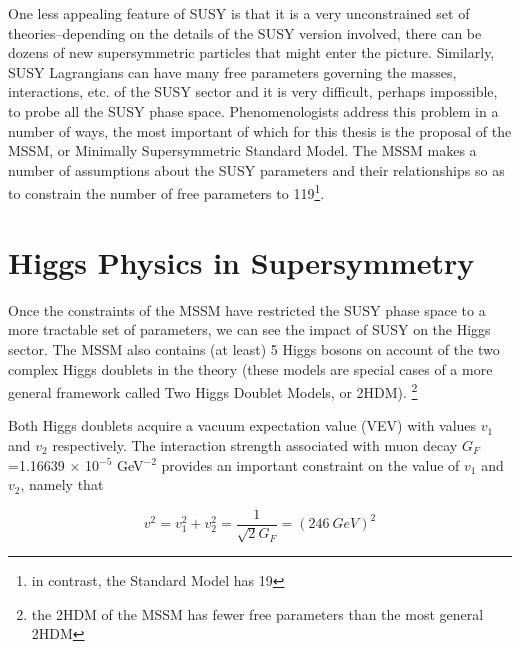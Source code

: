 One less appealing feature of SUSY is that it is a very unconstrained set 
of theories--depending on the details of the SUSY version involved, there can 
be dozens of new supersymmetric particles that might enter 
the picture.  Similarly, SUSY Lagrangians can have many free parameters governing the masses, 
interactions, etc. of the SUSY sector and it is very difficult, perhaps 
impossible, to probe all the SUSY phase space.  Phenomenologists address this problem in 
a number of ways, the most important of which for this thesis is the 
proposal of the MSSM, or Minimally Supersymmetric Standard Model.  The MSSM makes a 
number of assumptions about the SUSY parameters and their relationships so as to constrain the 
number of free parameters to 119\footnote{in
contrast, the Standard Model has 19}.  

\section{Higgs Physics in Supersymmetry}
\label{sec:SUSY_Higgs}
Once the constraints of the MSSM have restricted the SUSY phase space to a more 
tractable set of parameters, we can see the impact of SUSY on the Higgs sector.  
The MSSM also contains (at least) 5 Higgs bosons on account of the 
two complex Higgs doublets in the theory (these models are 
special cases of a more general framework called Two Higgs Doublet Models, or 2HDM).
\footnote{the 2HDM of the MSSM has fewer free parameters than the most general 2HDM}  



Both Higgs doublets acquire a vacuum expectation value (VEV) with values $v_1$ 
and $v_2$ respectively.  The interaction strength associated with
muon decay $G_F$=1.16639 $\times$ 10$^{-5}$ GeV$^{-2}$ 
provides an important constraint on the value of $v_1$ and $v_2$, namely that 

\begin{equation}
	v^2 = v_1^2 + v_2^2 = \frac{1}{\sqrt{2}G_F} = (246\ GeV)^2
	\label{eq:h_246}
\end{equation}


